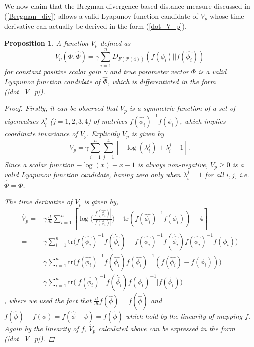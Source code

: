 \documentclass[letterpaper, 10 pt, conference]{ieeeconf}  %
\newtheorem{proposition}{Proposition}
\begin{document}
We now claim that the Bregman divergence based distance measure discussed in (\ref{Bregman_div}) allows a valid Lyapunov function candidate of $V_{p}$ whose time derivative can actually be derived in the form (\ref{dot_V_p}).
\begin{proposition}
A function $V_{p}$ defined as
\begin{equation}
V_{p}(\Phi,\hat{\Phi}) = \gamma \sum_{i=1}^n D_{F(\mathcal{P}(4))}(f(\phi_{i}) || f(\hat{\phi_{i}})) \label{bregman_V_p}
\end{equation}
 for constant positive scalar gain $\gamma$ and true parameter vector $\Phi$ is a valid Lyapunov function candidate of $\hat{\Phi}$, which is differentiated in the form (\ref{dot_V_p}).

\begin{proof}
Firstly, it can be observed that $V_{p}$ is a symmetric function of a set of eigenvalues $\lambda_{i}^{j}$ ($j=1,2,3,4$) of matrices $f(\hat{\phi_{i}})^{-1}f(\phi_{i})$, which implies coordinate invariance of $V_{p}$. Explicitly $V_{p}$ is given by
\begin{equation*}
V_{p} = \gamma\sum_{i=1}^{n}\sum_{j=1}^{4}[ - \log(\lambda_{i}^{j}) + \lambda_{i}^{j} - 1].
\end{equation*}
Since a scalar function $-\log(x)+x-1$ is always non-negative, $V_{p}\geq 0$ is a valid Lyapunov function candidate, having zero only when $\lambda_{i}^{j} = 1$ for all $i,j$, i.e. $ \hat{\Phi} = \Phi$.

The time derivative of $V_{p}$ is given by,
\begin{align}
\dot{V_{p}} =&\gamma\frac{d}{dt}\sum_{i=1}^n\left[\log\bigg(\frac{|f(\hat{\phi_{i}})|}{|f(\phi_{i})|}\bigg) + \mathrm{tr}(f(\hat{\phi_{i}})^{-1}f(\phi_{i})) - 4\right] \nonumber\\
=&\gamma\sum_{i=1}^n \mathrm{tr}\bigg(f(\hat{\phi_{i}})^{-1}f(\dot{\hat{\phi_{i}}})-f(\hat{\phi_{i}})^{-1}f(\dot{\hat{\phi_{i}}})f(\hat{\phi_{i}})^{-1}f(\phi_{i})\bigg)\nonumber\\
=& \gamma\sum_{i=1}^n \mathrm{tr}\bigg(f(\hat{\phi_{i}})^{-1}f(\dot{\hat{\phi_{i}}})f(\hat{\phi_{i}})^{-1}(f(\hat{\phi_{i}})-f(\phi_{i}))\bigg)\nonumber\\
=&\gamma\sum_{i=1}^n \mathrm{tr}\bigg(\big[f(\hat{\phi_{i}})^{-1}f(\dot{\hat{\phi_{i}}})f(\hat{\phi_{i}})^{-1}\big]f(\tilde{\phi_{i}})\bigg)\label{dot_V_p_bregman}
\end{align}
, where we used the fact that $\frac{d}{dt}f(\hat{\phi})=f(\dot{\hat{\phi}})$ and $f(\hat{\phi})-f(\phi) = f(\hat{\phi}-\phi) = f(\tilde{\phi})$ which hold by the linearity of mapping $f$. Again by the linearity of $f$, $\dot{V_{p}}$ calculated above can be expressed in the form (\ref{dot_V_p}).
\end{proof}
\end{proposition}
\end{document}

